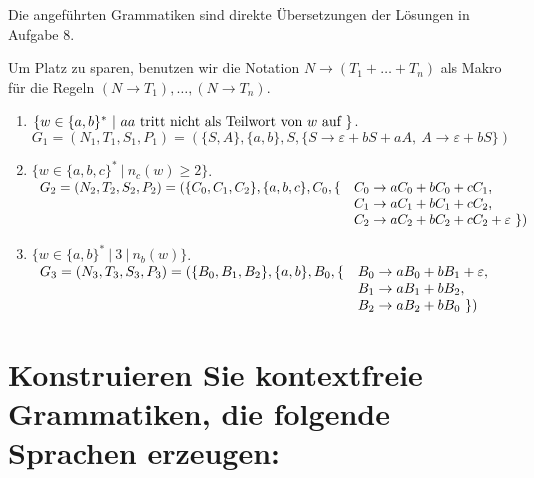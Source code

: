 \documentclass[]{scrartcl}
\newcommand{\e}{\varepsilon}
\newcommand{\grule}[2]{#1 \rightarrow #2}
\begin{document}
Die angeführten Grammatiken sind direkte Übersetzungen der Lösungen in Aufgabe 8.

Um Platz zu sparen, benutzen wir die Notation $\grule{N}{(T_1 + \dots + T_n)}$ als Makro für die Regeln $(\grule{N}{T_1}),\dots,(\grule{N}{T_n})$.

\begin{enumerate}
	\item $\{w \in \{ a,b \}^*\ |\ aa \textnormal{ tritt nicht als Teilwort von } w \textnormal{ auf } \}$.\\
	
	$G_1 = (N_1,T_1,S_1,P_1) = (\{S,A\}, \{a,b\}, S, \{ \grule{S}{\e + bS + aA},\
														\grule{A}{\e + bS}\})$
	
	\item $\{w \in \{ a,b,c \}^*\ |\ n_c(w) \geq 2 \}$.\\
	
	$
		\begin{array}{l l}
			G_2 = (N_2,T_2,S_2,P_2) = (\{C_0,C_1,C_2\}, \{a,b,c\}, C_0, \{
				& \grule{C_0}{aC_0 + bC_0 + cC_1},\\
			    & \grule{C_1}{aC_1 + bC_1 + cC_2},\\
				& \grule{C_2}{aC_2+bC_2+cC_2+\e}\
				\})
		\end{array}
	$
	
	\item $\{w \in \{ a,b \}^*\ |\ 3\ |\ n_b(w) \}$.\\
	
	$
		\begin{array}{l l}
			G_3 = (N_3,T_3,S_3,P_3) = (\{B_0,B_1,B_2\}, \{a,b\}, B_0, \{
				& \grule{B_0}{aB_0 + bB_1 + \e},\\
			    & \grule{B_1}{aB_1 + bB_2},\\
				& \grule{B_2}{aB_2+bB_0}\
				\})
		\end{array}
	$\\
\end{enumerate}

\newpage

\section{Konstruieren Sie kontextfreie Grammatiken, die folgende Sprachen erzeugen:}
\end{document}

